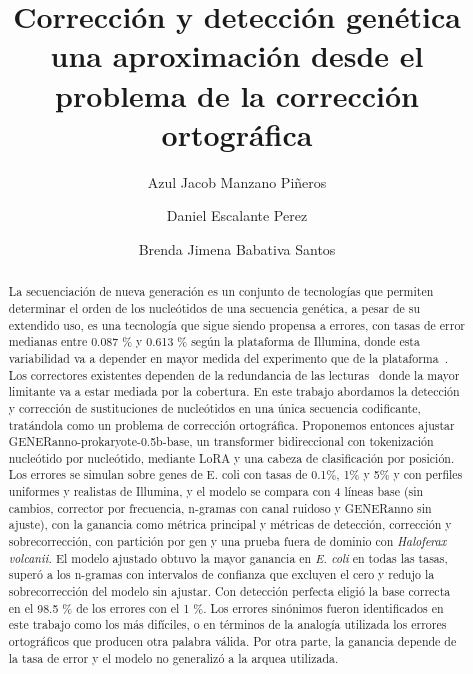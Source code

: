 \documentclass[sigconf,nonacm]{acmart}
\begin{document}
\setlength{\parskip}{0pt plus 4pt}\allowdisplaybreaks

\title{Corrección y detección genética una aproximación desde el problema de la corrección ortográfica}

\author{Azul Jacob Manzano Piñeros}

\author{Daniel Escalante Perez}

\author{Brenda Jimena Babativa Santos}

\begin{abstract}
La secuenciación de nueva generación es un conjunto de tecnologías que permiten determinar el orden de los nucleótidos de una secuencia genética, a pesar de su extendido uso, es una tecnología que sigue siendo propensa a errores, con tasas de error medianas entre 0.087 \% y 0.613 \% según la plataforma de Illumina, donde esta variabilidad va a depender en mayor medida del experimento que de la plataforma~\cite{stoler2021sequencing}. Los correctores existentes dependen de la redundancia de las lecturas~\cite{mitchell2020benchmarking} donde la mayor limitante va a estar mediada por la cobertura. En este trabajo abordamos la detección y corrección de sustituciones de nucleótidos en una única secuencia codificante, tratándola como un problema de corrección ortográfica. Proponemos entonces ajustar GENERanno-prokaryote-0.5b-base, un transformer bidireccional con tokenización nucleótido por nucleótido, mediante LoRA y una cabeza de clasificación por posición. Los errores se simulan sobre genes de E. coli con tasas de 0.1\%, 1\% y 5\% y con perfiles uniformes y realistas de Illumina, y el modelo se compara con 4 líneas base (sin cambios, corrector por frecuencia, n-gramas con canal ruidoso y GENERanno sin ajuste), con la ganancia como métrica principal y métricas de detección, corrección y sobrecorrección, con partición por gen y una prueba fuera de dominio con \emph{Haloferax volcanii.} El modelo ajustado obtuvo la mayor ganancia en \emph{E. coli} en todas las tasas, superó a los n-gramas con intervalos de confianza que excluyen el cero y redujo la sobrecorrección del modelo sin ajustar. Con detección perfecta eligió la base correcta en el 98.5 \% de los errores con el 1 \%. Los errores sinónimos fueron identificados en este trabajo como los más difíciles, o en términos de la analogía utilizada los errores ortográficos que producen otra palabra válida. Por otra parte, la ganancia depende de la tasa de error y el modelo no generalizó a la arquea utilizada.
\end{abstract}
\end{document}
